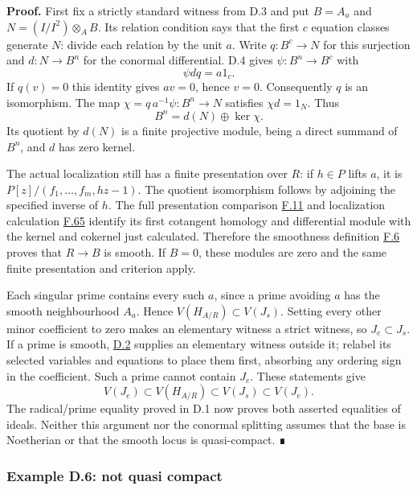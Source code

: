 \documentclass[11pt,a4paper,openany]{report}
\begin{document}
\textbf{Proof.} First fix a strictly standard witness from D.3 and put \(B=A_a\) and \(N=(I/I^2)\otimes_A B\). Its relation condition says that the first \(c\) equation classes generate \(N\): divide each relation by the unit \(a\). Write \(q:B^c\to N\) for this surjection and \(d:N\to B^n\) for the conormal differential. D.4 gives \(\psi:B^n\to B^c\) with \[\psi d q=a1_c.\] If \(q(v)=0\) this identity gives \(av=0\), hence \(v=0\). Consequently \(q\) is an isomorphism. The map \(\chi=q\,a^{-1}\psi:B^n\to N\) satisfies \(\chi d=1_N\). Thus \[B^n=d(N)\oplus\ker\chi.\] Its quotient by \(d(N)\) is a finite projective module, being a direct summand of \(B^n\), and \(d\) has zero kernel.

The actual localization still has a finite presentation over \(R\): if \(h\in P\) lifts \(a\), it is \(P[z]/(f_1,\ldots,f_m,hz-1)\). The quotient isomorphism follows by adjoining the specified inverse of \(h\). The full presentation comparison \hyperref[AG-RG-S05-algebra-lemma-NL-homotopy]{F.11} and localization calculation \hyperref[AG-RG-S05-algebra-lemma-localize-NL]{F.65} identify its first cotangent homology and differential module with the kernel and cokernel just calculated. Therefore the smoothness definition \hyperref[AG-RG-S05-algebra-definition-smooth]{F.6} proves that \(R\to B\) is smooth. If \(B=0\), these modules are zero and the same finite presentation and criterion apply.

Each singular prime contains every such \(a\), since a prime avoiding \(a\) has the smooth neighbourhood \(A_a\). Hence \(V(H_{A/R})\subset V(J_s)\). Setting every other minor coefficient to zero makes an elementary witness a strict witness, so \(J_e\subset J_s\). If a prime is smooth, \hyperref[AG-RG-S05-smoothing-lemma-find-strictly-standard]{D.2} supplies an elementary witness outside it; relabel its selected variables and equations to place them first, absorbing any ordering sign in the coefficient. Such a prime cannot contain \(J_e\). These statements give \[V(J_e)\subset V(H_{A/R})\subset V(J_s)\subset V(J_e).\] The radical/prime equality proved in D.1 now proves both asserted equalities of ideals. Neither this argument nor the conormal splitting assumes that the base is Noetherian or that the smooth locus is quasi-compact. ∎

\label{AG-RG-S05-smoothing-example-not-quasi-compact}

\subsubsection{Example D.6: not quasi compact}\label{AG-RG-S05-example-d.6-not-quasi-compact}
\end{document}
